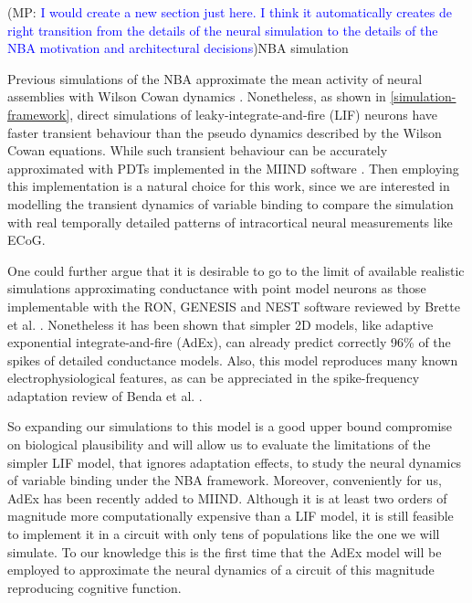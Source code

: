\documentclass[10pt]{article}
\newcommand{\noteMP}[3]{(MP: \textcolor{blue}{#1})}
\begin{document}
\noteMP{I would create a new section just here. I think it automatically creates de right transition from the details of the neural simulation to the details of the NBA motivation and architectural decisions}.


\subsection{NBA simulation}\label{architectural-decisions}

Previous simulations of the NBA approximate the mean activity of neural assemblies with Wilson Cowan dynamics \cite{Frank_2014}.
Nonetheless, as shown in \ref{simulation-framework}, direct simulations of leaky-integrate-and-fire (LIF) neurons \cite{omurtag2000simulation} have faster transient behaviour than the pseudo dynamics described by the Wilson Cowan equations.
While such transient behaviour can be accurately approximated with PDTs \cite{de2013generic} implemented in the MIIND software \cite{de_Kamps_2008}. 
Then employing this implementation is a natural choice for this work, since we are interested in modelling the transient dynamics of variable binding to compare the simulation with real temporally detailed patterns of intracortical neural measurements like ECoG.

One could further argue that it is desirable to go to the limit of available realistic simulations approximating conductance with point model neurons as those implementable with the RON, GENESIS and NEST software reviewed by Brette et al. \cite{brette2007simulation}.
Nonetheless it has been shown that simpler 2D models, like adaptive exponential integrate-and-fire (AdEx), can already predict correctly 96\% of the spikes of detailed conductance models\cite{brette2005adaptive}.
Also, this model reproduces many known electrophysiological features, as can be appreciated in the spike-frequency adaptation review of Benda et al. \cite{Benda_2003,Benda_2014}.

So expanding our simulations to this model is a good upper bound compromise on biological plausibility and will allow us to evaluate the limitations of the simpler LIF model, that ignores adaptation effects, to study the neural dynamics of variable binding under the NBA framework.
Moreover, conveniently for us, AdEx has been recently added to MIIND. Although it is at least two orders of magnitude more computationally expensive than a LIF model, it is still feasible to implement it in a circuit with only tens of populations like the one we will simulate.
To our knowledge this is the first time that the AdEx model will be employed to approximate the neural dynamics of a circuit of this magnitude reproducing cognitive function.
\end{document}
